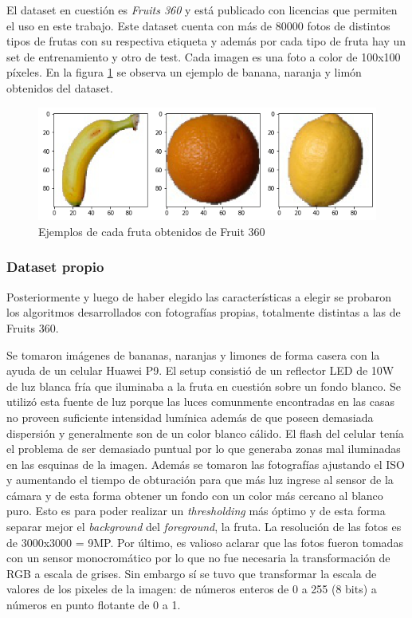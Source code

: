 \documentclass[10pt, a4paper]{article}
\begin{document}
El dataset en cuestión es \textit{Fruits 360} \cite{fruit-360} y está publicado con licencias que permiten el uso en este trabajo. Este dataset cuenta con más de 80000 fotos de distintos tipos de frutas con su respectiva etiqueta y además por cada tipo de fruta hay un set de entrenamiento y otro de test. Cada imagen es una foto a color de 100x100 píxeles. En la figura \ref{fig:dataset_sample} se observa un ejemplo de banana, naranja y limón obtenidos del dataset. 

\begin{figure}[h]
    \centering
    \includegraphics[width=\textwidth]{imgs/dataset_sample.png}
    \caption{Ejemplos de cada fruta obtenidos de Fruit 360}
    \label{fig:dataset_sample}
\end{figure}

\subsubsection{Dataset propio}

Posteriormente y luego de haber elegido las características a elegir se probaron los algoritmos desarrollados con fotografías propias, totalmente distintas a las de Fruits 360. 

Se tomaron imágenes de bananas, naranjas y limones de forma casera con la ayuda de un celular Huawei P9. El setup consistió de un reflector LED de 10W de luz blanca fría que iluminaba a la fruta en cuestión sobre un fondo blanco. Se utilizó esta fuente de luz porque las luces comunmente encontradas en las casas no proveen suficiente intensidad lumínica además de que poseen demasiada dispersión y generalmente son de un color blanco cálido. El flash del celular tenía el problema de ser demasiado puntual por lo que generaba zonas mal iluminadas en las esquinas de la imagen. Además se tomaron las fotografías ajustando el ISO y aumentando el tiempo de obturación para que más luz ingrese al sensor de la cámara y de esta forma obtener un fondo con un color más cercano al blanco puro. Esto es para poder realizar un \textit{thresholding} más óptimo y de esta forma separar mejor el \textit{background} del \textit{foreground}, la fruta. La resolución de las fotos es de 3000x3000 = 9MP. Por último, es valioso aclarar que las fotos fueron tomadas con un sensor monocromático por lo que no fue necesaria la transformación de RGB a escala de grises. Sin embargo sí se tuvo que transformar la escala de valores de los pixeles de la imagen: de números enteros de 0 a 255 (8 bits) a números en punto flotante de 0 a 1. 
\end{document}
